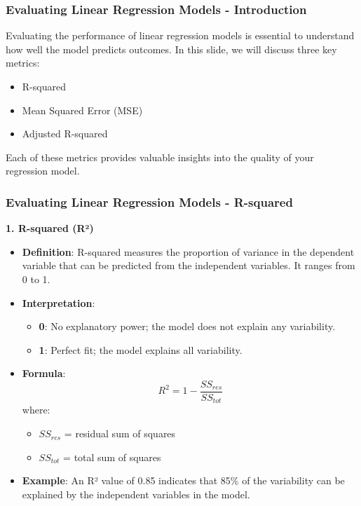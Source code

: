 \documentclass[aspectratio=169]{beamer}
\begin{document}
\begin{frame}[fragile]
    \frametitle{Evaluating Linear Regression Models - Introduction}
    Evaluating the performance of linear regression models is essential to understand how well the model predicts outcomes. In this slide, we will discuss three key metrics:
    \begin{itemize}
        \item R-squared
        \item Mean Squared Error (MSE)
        \item Adjusted R-squared
    \end{itemize}
    Each of these metrics provides valuable insights into the quality of your regression model.
\end{frame}

\begin{frame}[fragile]
    \frametitle{Evaluating Linear Regression Models - R-squared}
    \textbf{1. R-squared (R²)} \\
    \begin{itemize}
        \item \textbf{Definition}: R-squared measures the proportion of variance in the dependent variable that can be predicted from the independent variables. It ranges from 0 to 1.
        \item \textbf{Interpretation}: 
        \begin{itemize}
            \item \textbf{0}: No explanatory power; the model does not explain any variability.
            \item \textbf{1}: Perfect fit; the model explains all variability.
        \end{itemize}
        \item \textbf{Formula}:
            \begin{equation}
                R^2 = 1 - \frac{SS_{res}}{SS_{tot}}
            \end{equation}
            where:
            \begin{itemize}
                \item \(SS_{res}\) = residual sum of squares
                \item \(SS_{tot}\) = total sum of squares
            \end{itemize}
        \item \textbf{Example}: An R² value of 0.85 indicates that 85\% of the variability can be explained by the independent variables in the model.
    \end{itemize}
\end{frame}
\end{document}
